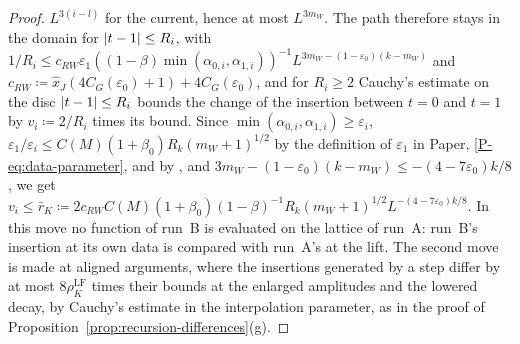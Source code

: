 \documentclass[11pt]{preprint}
\DeclarePairedDelimiter{\abs}{\lvert}{\rvert}
\numberwithin{equation}{section}
\theoremstyle{definition}
\theoremstyle{remark}
\theoremstyle{plain}
\begin{document}
\begin{proof}
$L^{3(i-l)}$ for the current, hence at most $L^{3m_W}$. The path therefore stays in the domain for $\abs{t - 1} \leq R_i$, with $1/R_i \leq c_{RW}\varepsilon_1((1 - \beta)\min(\alpha_{0,i}, \alpha_{1,i}))^{-1}L^{3m_W-(1-\varepsilon_0)(k-m_W)}$ and $c_{RW} \coloneqq \hat x_J(4C_G(\varepsilon_0) + 1) + 4C_G(\varepsilon_0)$, and for $R_i \geq 2$ Cauchy's estimate on the disc $\abs{t - 1} \leq R_i$ bounds the change of the insertion between $t = 0$ and $t = 1$ by $v_i \coloneqq 2/R_i$ times its bound. Since $\min(\alpha_{0,i}, \alpha_{1,i}) \geq \varepsilon_i$, $\varepsilon_1/\varepsilon_i \leq C(M)(1 + \beta_0)R_k(m_W + 1)^{1/2}$ by the definition of $\varepsilon_1$ in Paper, \eqref{P-eq:data-parameter}, and by \cite[(2.4), (2.6), p.~255]{BalabanCRE}, and $3m_W - (1 - \varepsilon_0)(k - m_W) \leq -(4 - 7\varepsilon_0)k/8$, we get $v_i \leq \bar r_K \coloneqq 2c_{RW}C(M)(1 + \beta_0)(1 - \beta)^{-1}R_k(m_W + 1)^{1/2}L^{-(4-7\varepsilon_0)k/8}$. In this move no function of run~B is evaluated on the lattice of run~A: run~B's insertion at its own data is compared with run~A's at the lift. The second move is made at aligned arguments, where the insertions generated by a step differ by at most $8\rho^{\mathrm{LF}}_K$ times their bounds at the enlarged amplitudes and the lowered decay, by Cauchy's estimate in the interpolation parameter, as in the proof of Proposition~\ref{prop:recursion-differences}(g).


\end{proof}
\end{document}
